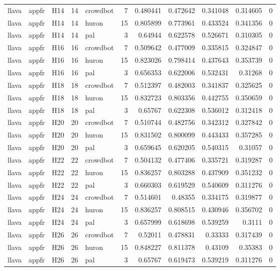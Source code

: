 \begin{longtable}{lllrlrrrrrr}
llava & appfr & H14 & 14 & crowdbot & 7 & 0.480441 & 0.472642 & 0.341048 & 0.314605 & 0 \\
llava & appfr & H14 & 14 & huron & 15 & 0.805899 & 0.773961 & 0.433524 & 0.341356 & 0 \\
llava & appfr & H14 & 14 & pal & 3 & 0.64944 & 0.622578 & 0.526671 & 0.310305 & 0 \\
llava & appfr & H16 & 16 & crowdbot & 7 & 0.509642 & 0.477009 & 0.335815 & 0.324847 & 0 \\
llava & appfr & H16 & 16 & huron & 15 & 0.823026 & 0.798414 & 0.437643 & 0.353739 & 0 \\
llava & appfr & H16 & 16 & pal & 3 & 0.656353 & 0.622006 & 0.532431 & 0.31268 & 0 \\
llava & appfr & H18 & 18 & crowdbot & 7 & 0.512397 & 0.482003 & 0.341837 & 0.325625 & 0 \\
llava & appfr & H18 & 18 & huron & 15 & 0.832723 & 0.803356 & 0.442755 & 0.350659 & 0 \\
llava & appfr & H18 & 18 & pal & 3 & 0.65767 & 0.622308 & 0.536012 & 0.312418 & 0 \\
llava & appfr & H20 & 20 & crowdbot & 7 & 0.510744 & 0.482756 & 0.342312 & 0.327842 & 0 \\
llava & appfr & H20 & 20 & huron & 15 & 0.831502 & 0.800099 & 0.443433 & 0.357285 & 0 \\
llava & appfr & H20 & 20 & pal & 3 & 0.659645 & 0.620205 & 0.540315 & 0.31057 & 0 \\
llava & appfr & H22 & 22 & crowdbot & 7 & 0.504132 & 0.477406 & 0.335721 & 0.319287 & 0 \\
llava & appfr & H22 & 22 & huron & 15 & 0.836257 & 0.803288 & 0.437909 & 0.351232 & 0 \\
llava & appfr & H22 & 22 & pal & 3 & 0.660303 & 0.619529 & 0.540609 & 0.311276 & 0 \\
llava & appfr & H24 & 24 & crowdbot & 7 & 0.514601 & 0.48355 & 0.334175 & 0.319877 & 0 \\
llava & appfr & H24 & 24 & huron & 15 & 0.836257 & 0.808515 & 0.430946 & 0.356702 & 0 \\
llava & appfr & H24 & 24 & pal & 3 & 0.657999 & 0.618698 & 0.539259 & 0.3111 & 0 \\
llava & appfr & H26 & 26 & crowdbot & 7 & 0.52011 & 0.478831 & 0.33333 & 0.317439 & 0 \\
llava & appfr & H26 & 26 & huron & 15 & 0.848227 & 0.811378 & 0.43109 & 0.35383 & 0 \\
llava & appfr & H26 & 26 & pal & 3 & 0.65767 & 0.619473 & 0.539219 & 0.311276 & 0 \\

\end{longtable}
